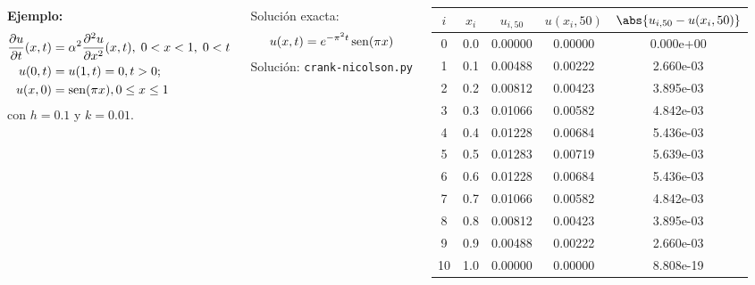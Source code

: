 \documentclass[9pt, aspectratio=169]{beamer}
\begin{document}
\begin{frame}
\begin{columns}
\textbf{Ejemplo:} 
\begin{align*}
\frac{\partial u}{\partial t} (x, t) &= \alpha^2 \frac{\partial^2 u}{\partial x^2}(x, t), \; 0 < x < 1, \; 0 < t \\
u(0, t) &= u(1, t) = 0, t > 0; \\
u(x, 0) &= \operatorname{sen}(\pi x), 0 \leq x \leq 1
\end{align*}
con $h = 0.1$ y \alert{$k = 0.01$}.

Solución exacta:
\[u(x, t) = e^{-\pi^2 t} \operatorname{sen} (\pi x) \]
\centering Solución: \texttt{crank-nicolson.py}

\begin{center}
\begin{tabular}{ccccc}
\toprule
$i$ & $x_i$ & $u_{i,50}$ & $u(x_i, 50)$ & $\abs{u_{i, 50} - u(x_i, 50)}$ \\
\midrule
0 & 0.0 & 0.00000 & 0.00000 & 0.000e+00 \\
1 & 0.1 & 0.00488 & 0.00222 & 2.660e-03 \\
2 & 0.2 & 0.00812 & 0.00423 & 3.895e-03 \\
3 & 0.3 & 0.01066 & 0.00582 & 4.842e-03 \\
4 & 0.4 & 0.01228 & 0.00684 & 5.436e-03 \\
5 & 0.5 & 0.01283 & 0.00719 & 5.639e-03 \\
6 & 0.6 & 0.01228 & 0.00684 & 5.436e-03 \\
7 & 0.7 & 0.01066 & 0.00582 & 4.842e-03 \\
8 & 0.8 & 0.00812 & 0.00423 & 3.895e-03 \\
9 & 0.9 & 0.00488 & 0.00222 & 2.660e-03 \\
10 & 1.0 & 0.00000 & 0.00000 & 8.808e-19 \\
\bottomrule
\end{tabular} 
\end{center}
\end{columns} 
\end{frame}
\end{document}
